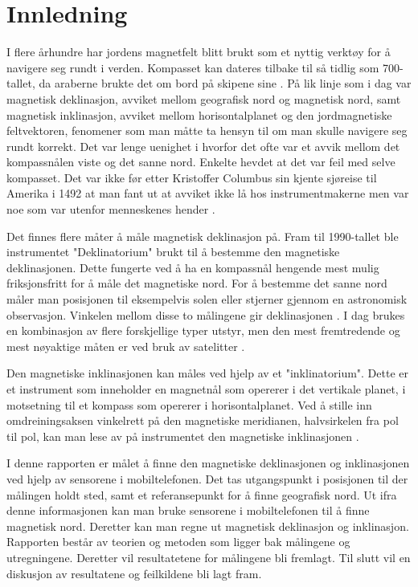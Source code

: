 \section{Innledning}

I flere århundre har jordens magnetfelt blitt brukt som et nyttig verktøy for å navigere seg rundt i verden. Kompasset kan dateres tilbake til så tidlig som 700-tallet, da araberne brukte det om bord på skipene sine \cite{kompass}. På lik linje som i dag var magnetisk deklinasjon, avviket mellom geografisk nord og magnetisk nord, samt magnetisk inklinasjon, avviket mellom horisontalplanet og den jordmagnetiske feltvektoren, fenomener som man måtte ta hensyn til om man skulle navigere seg rundt korrekt. Det var lenge uenighet i hvorfor det ofte var et avvik mellom det kompassnålen viste og det sanne nord. Enkelte hevdet at det var feil med selve kompasset. Det var ikke før etter Kristoffer Columbus sin kjente sjøreise til Amerika i 1492 at man fant ut at avviket ikke lå hos instrumentmakerne men var noe som var utenfor menneskenes hender \cite{kompass}. 

Det finnes flere måter å måle magnetisk deklinasjon på. Fram til 1990-tallet ble instrumentet "Deklinatorium" brukt til å bestemme den magnetiske deklinasjonen. Dette fungerte ved å ha en kompassnål hengende mest mulig friksjonsfritt for å måle det magnetiske nord. For å bestemme det sanne nord måler man posisjonen til eksempelvis solen eller stjerner gjennom en astronomisk observasjon. Vinkelen mellom disse to målingene gir deklinasjonen \cite{deklinatorium}. I dag brukes en kombinasjon av flere forskjellige typer utstyr, men den mest fremtredende og mest nøyaktige måten er ved bruk av satelitter \cite{World_magnetic_model}.    

Den magnetiske inklinasjonen kan måles ved hjelp av et "inklinatorium". Dette er et instrument som inneholder en magnetnål som opererer i det vertikale planet, i motsetning til et kompass som opererer i horisontalplanet. Ved å stille inn omdreiningsaksen vinkelrett på den magnetiske meridianen, halvsirkelen fra pol til pol, kan man lese av på instrumentet den magnetiske inklinasjonen \cite{inklinometer}. 

I denne rapporten er målet å finne den magnetiske deklinasjonen og inklinasjonen ved hjelp av sensorene i mobiltelefonen. Det tas utgangspunkt i posisjonen til der målingen holdt sted, samt et referansepunkt for å finne geografisk nord. Ut ifra denne informasjonen kan man bruke sensorene i mobiltelefonen til å finne magnetisk nord. Deretter kan man regne ut magnetisk deklinasjon og inklinasjon. Rapporten består av teorien og metoden som ligger bak målingene og utregningene. Deretter vil resultatetene for målingene bli fremlagt. Til slutt vil en diskusjon av resultatene og feilkildene bli lagt fram. \newline 


